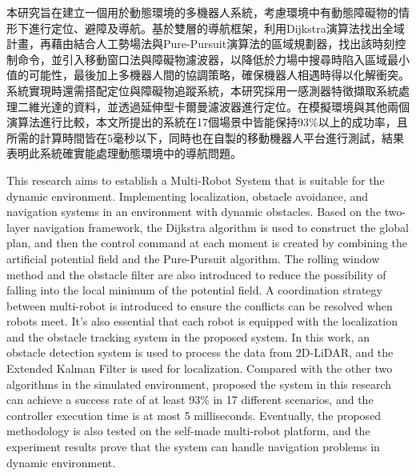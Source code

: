 \begin{abstractzh}
\setcounter{page}{1}

本研究旨在建立一個用於動態環境的多機器人系統，考慮環境中有動態障礙物的情形下進行定位、避障及導航。基於雙層的導航框架，利用Dijkstra演算法找出全域計畫，再藉由結合人工勢場法與Pure-Pursuit演算法的區域規劃器，找出該時刻控制命令，並引入移動窗口法與障礙物濾波器，以降低於力場中搜尋時陷入區域最小值的可能性，最後加上多機器人間的協調策略，確保機器人相遇時得以化解衝突。系統實現時還需搭配定位與障礙物追蹤系統，本研究採用一感測器特徵擷取系統處理二維光達的資料，並透過延伸型卡爾曼濾波器進行定位。在模擬環境與其他兩個演算法進行比較，本文所提出的系統在17個場景中皆能保持93\%以上的成功率，且所需的計算時間皆在5毫秒以下，同時也在自製的移動機器人平台進行測試，結果表明此系統確實能處理動態環境中的導航問題。


\end{abstractzh}


\begin{abstracten}
\begin{spacing}{1.5}

This research aims to establish a Multi-Robot System that is suitable for the dynamic environment. Implementing localization, obstacle avoidance, and navigation systems in an environment with dynamic obstacles. Based on the two-layer navigation framework, the Dijkstra algorithm is used to construct the global plan, and then the control command at each moment is created by combining the artificial potential field and the Pure-Pursuit algorithm. The rolling window method and the obstacle filter are also introduced to reduce the possibility of falling into the local minimum of the potential field. A coordination strategy between multi-robot is introduced to ensure the conflicts can be resolved when robots meet. It's also essential that each robot is equipped with the localization and the obstacle tracking system in the proposed system. In this work, an obstacle detection system is used to process the data from 2D-LiDAR, and the Extended Kalman Filter is used for localization. Compared with the other two algorithms in the simulated environment, proposed the system in this research can achieve a success rate of at least 93\% in 17 different scenarios, and the controller execution time is at most 5 milliseconds. Eventually, the proposed methodology is also tested on the self-made multi-robot platform, and the experiment results prove that the system can handle navigation problems in dynamic environment.


\end{spacing}
\end{abstracten}

